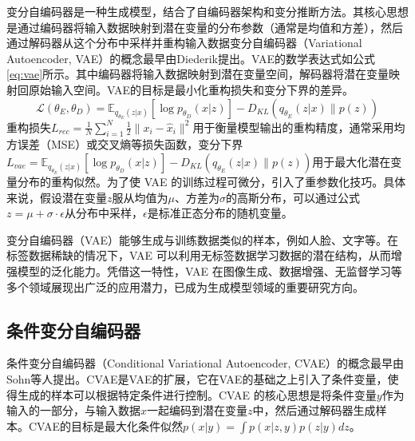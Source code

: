 变分自编码器是一种生成模型，结合了自编码器架构和变分推断方法。其核心思想是通过编码器将输入数据映射到潜在变量的分布参数（通常是均值和方差），然后通过解码器从这个分布中采样并重构输入数据变分自编码器（Variational Autoencoder, VAE）的概念最早由Diederik提出。VAE的数学表达式如公式\eqref{eq:vae}所示。其中编码器将输入数据映射到潜在变量空间，解码器将潜在变量映射回原始输入空间。VAE的目标是最小化重构损失和变分下界的差异\cite{kingma2013auto}。
\begin{equation}
  \mathcal{L}(\theta_E, \theta_D) = \mathbb{E}_{q_{\theta_E}(z|x)} \left[ \log p_{\theta_D}(x|z) \right] - D_{KL}(q_{\theta_E}(z|x) \| p(z)) \label{eq:vae}
\end{equation}
重构损失$L_{rec} = \frac{1}{N} \sum_{i=1}^{N} \frac{1}{2} \| x_i - \hat{x}_i \|^2$用于衡量模型输出的重构精度，通常采用均方误差（MSE）或交叉熵等损失函数，变分下界$L_{vae} = \mathbb{E}_{q_{\theta_E}(z|x)} \left[ \log p_{\theta_D}(x|z) \right] - D_{KL}(q_{\theta_E}(z|x) \| p(z))
$用于最大化潜在变量分布的重构似然。为了使 VAE 的训练过程可微分，引入了重参数化技巧。具体来说，假设潜在变量$z$服从均值为$\mu$、方差为$\sigma$的高斯分布，可以通过公式$z = \mu + \sigma \cdot \epsilon$从分布中采样，$\epsilon$是标准正态分布的随机变量。

变分自编码器（VAE）能够生成与训练数据类似的样本，例如人脸、文字等。在标签数据稀缺的情况下，VAE 可以利用无标签数据学习数据的潜在结构，从而增强模型的泛化能力。凭借这一特性，VAE 在图像生成、数据增强、无监督学习等多个领域展现出广泛的应用潜力，已成为生成模型领域的重要研究方向。
\subsection{条件变分自编码器}
条件变分自编码器（Conditional Variational Autoencoder, CVAE）的概念最早由Sohn等人提出\cite{SohnLee2015ConditionalVAE}。CVAE是VAE的扩展，它在VAE的基础之上引入了条件变量，使得生成的样本可以根据特定条件进行控制。CVAE 的核心思想是将条件变量$y$作为输入的一部分，与输入数据$x$一起编码到潜在变量$z$中，然后通过解码器生成样本。CVAE的目标是最大化条件似然$p(x|y) = \int p(x|z,y) p(z|y) dz$。

